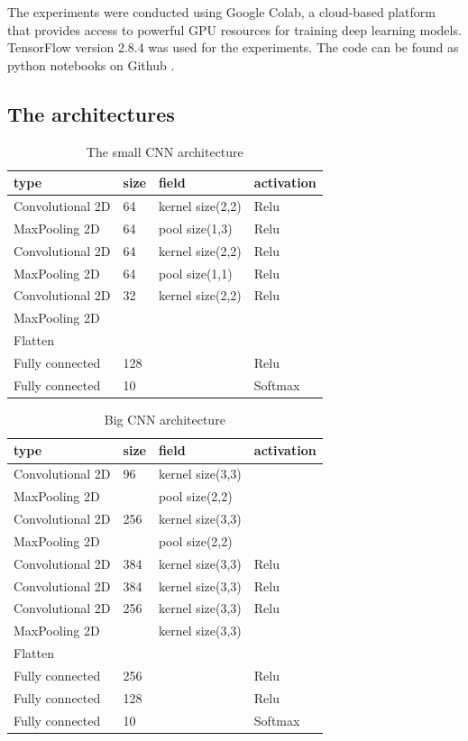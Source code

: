\documentclass{report}
\theoremstyle{definition}
\theoremstyle{remark}
\begin{document}
\newpage

The experiments were conducted using Google Colab, a cloud-based platform that provides access to powerful GPU resources for training deep learning models. TensorFlow version 2.8.4 was used for the experiments. The code can be found as python notebooks on Github \cite{GH}.

\subsection{The architectures}
\begin{table}[!hbt]
\centering
\begin{tabularx}{0.7\textwidth}{llll}
\hline
type & size & field & activation \\ \hline
Convolutional 2D & 64 & kernel size(2,2) & Relu \\
MaxPooling 2D & 64 & pool size(1,3) & Relu \\
Convolutional 2D & 64 & kernel size(2,2) & Relu \\
MaxPooling 2D & 64 & pool size(1,1) & Relu \\
Convolutional 2D & 32 & kernel size(2,2) & Relu \\
MaxPooling 2D & & &  \\
Flatten & & &  \\
Fully connected & 128 & & Relu  \\
Fully connected & 10 & & Softmax \\ \hline
\end{tabularx}
\caption{The small CNN architecture}
\label{tab:small_cnn}
\end{table}

\begin{table}[!hbt]
\centering
\begin{tabularx}{0.7\textwidth}{llll}
\hline
type & size & field & activation \\ \hline
Convolutional 2D & 96 & kernel size(3,3) &  \\
MaxPooling 2D &  & pool size(2,2) &  \\
Convolutional 2D & 256 & kernel size(3,3) &  \\
MaxPooling 2D &  & pool size(2,2) &  \\
Convolutional 2D & 384 & kernel size(3,3) & Relu \\
Convolutional 2D & 384 & kernel size(3,3) & Relu \\
Convolutional 2D & 256 & kernel size(3,3) & Relu \\
MaxPooling 2D & & kernel size(3,3) &  \\
Flatten & & &  \\
Fully connected & 256 & & Relu  \\
Fully connected & 128 & & Relu \\ 
Fully connected & 10 & & Softmax \\ 
\hline
\end{tabularx}
\caption{Big CNN architecture}
\label{tab:big_cnn}
\end{table}
\end{document}
